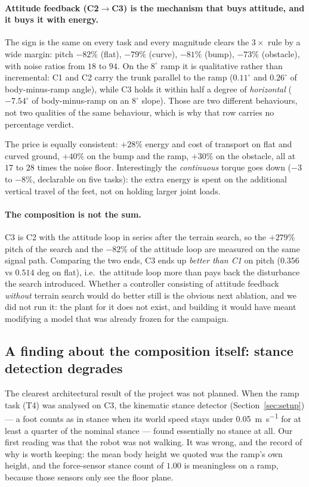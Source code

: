 \documentclass[11pt,a4paper]{article}
\newcommand{\Co}{\textsf{C1}}
\newcommand{\Ct}{\textsf{C2}}
\newcommand{\Cth}{\textsf{C3}}
\begin{document}
\paragraph{Attitude feedback (\Ct$\rightarrow$\Cth) is the mechanism that buys
attitude, and it buys it with energy.} The sign is the same on every task and
every magnitude clears the $3\times$ rule by a wide margin: pitch
$-82\%$ (flat), $-79\%$ (curve), $-81\%$ (bump), $-73\%$ (obstacle), with
noise ratios from $18$ to $94$. On the $8^\circ$ ramp it is qualitative rather
than incremental: \Co{} and \Ct{} carry the trunk parallel to the ramp
($0.11^\circ$ and $0.26^\circ$ of body-minus-ramp angle), while \Cth{} holds it
within half a degree of \emph{horizontal} ($-7.54^\circ$ of body-minus-ramp on
an $8^\circ$ slope). Those are two different behaviours, not two qualities of
the same behaviour, which is why that row carries no percentage verdict.

The price is equally consistent: $+28\%$ energy and cost of transport on flat
and curved ground, $+40\%$ on the bump and the ramp, $+30\%$ on the obstacle,
all at $17$ to $28$ times the noise floor. Interestingly the \emph{continuous}
torque goes down ($-3$ to $-8\%$, declarable on five tasks): the extra energy
is spent on the additional vertical travel of the feet, not on holding larger
joint loads.

\paragraph{The composition is not the sum.} \Cth{} is \Ct{} with the attitude
loop in series after the terrain search, so the $+279\%$ pitch of the search
and the $-82\%$ of the attitude loop are measured on the same signal path.
Comparing the two ends, \Cth{} ends up \emph{better than \Co} on pitch
($0.356$ vs $0.514$ deg on flat), i.e.\ the attitude loop more than pays back
the disturbance the search introduced. Whether a controller consisting of
attitude feedback \emph{without} terrain search would do better still is the
obvious next ablation, and we did not run it: the plant for it does not exist,
and building it would have meant modifying a model that was already frozen for
the campaign.

\subsection{A finding about the composition itself: stance detection degrades}

The clearest architectural result of the project was not planned. When the
ramp task (T4) was analysed on \Cth, the kinematic stance detector
(Section~\ref{sec:setup}) --- a foot counts as in stance when its world speed
stays under \SI{0.05}{\meter\per\second} for at least a quarter of the nominal
stance --- found essentially no stance at all. Our first reading was that the
robot was not walking. It was wrong, and the record of why is worth keeping:
the mean body height we quoted was the ramp's own height, and the
force-sensor stance count of $1.00$ is meaningless on a ramp, because those
sensors only see the floor plane.
\end{document}
